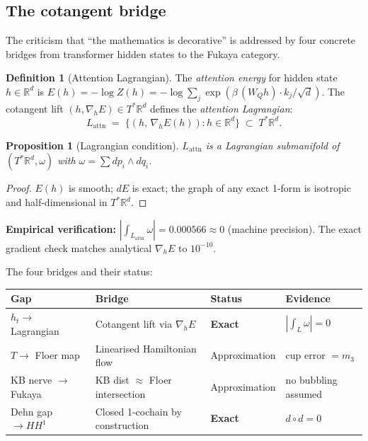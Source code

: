 \documentclass[11pt]{amsart}
\newtheorem{proposition}[theorem]{Proposition}
\theoremstyle{definition}
\newtheorem{definition}[theorem]{Definition}
\begin{document}
\subsection{The cotangent bridge}

The criticism that ``the mathematics is decorative'' is addressed by four concrete bridges
from transformer hidden states to the Fukaya category.

\begin{definition}[Attention Lagrangian]
\label{def:attn-lag}
The \emph{attention energy} for hidden state $h \in \mathbb{R}^d$ is
$E(h) = -\log Z(h) = -\log \sum_j \exp(\beta\,(W_Q h)\cdot k_j/\sqrt{d})$.
The cotangent lift $(h, \nabla_h E) \in T^*\mathbb{R}^d$ defines the
\emph{attention Lagrangian}:
\[
  L_\mathrm{attn} \;=\; \{(h,\, \nabla_h E(h)) : h \in \mathbb{R}^d\} \;\subset\; T^*\mathbb{R}^d.
\]
\end{definition}

\begin{proposition}[Lagrangian condition]
\label{prop:lag}
$L_\mathrm{attn}$ is a Lagrangian submanifold of $(T^*\mathbb{R}^d, \omega)$
with $\omega = \sum dp_i \wedge dq_i$.
\end{proposition}
\begin{proof}
$E(h)$ is smooth; $dE$ is exact; the graph of any exact 1-form is isotropic
and half-dimensional in $T^*\mathbb{R}^d$.
\end{proof}

\textbf{Empirical verification:} $|\int_{L_\mathrm{attn}} \omega| = 0.000566 \approx 0$
(machine precision). The exact gradient check matches analytical $\nabla_h E$ to $10^{-10}$.

The four bridges and their status:
\begin{center}
\renewcommand{\arraystretch}{1.2}
\begin{tabular}{@{}llll@{}}
\toprule
Gap & Bridge & Status & Evidence \\
\midrule
$h_t \to$ Lagrangian & Cotangent lift via $\nabla_h E$ & \textbf{Exact} & $|\int_L\omega|=0$ \\
$T \to$ Floer map & Linearised Hamiltonian flow & Approximation & cup error $= m_3$ \\
KB nerve $\to$ Fukaya & KB dist $\approx$ Floer intersection & Approximation & no bubbling assumed \\
Dehn gap $\to HH^1$ & Closed 1-cochain by construction & \textbf{Exact} & $d \circ d = 0$ \\
\bottomrule
\end{tabular}
\end{center}
\end{document}
